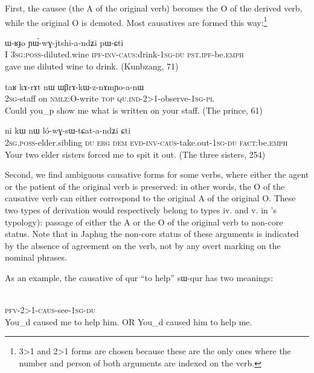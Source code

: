 \documentclass[oldfontcommands,oneside,a4paper,11pt]{article}
\newcommand{\ipa}[1]{{\phon \mbox{#1}}} %
\newcommand{\sg}{\textsc{sg}}
\newcommand{\pl}{\textsc{pl}}
\newcommand{\wav}[1]{}%
\newcommand{\pfv}{\textsc{pfv}}
\newcommand{\caus}{\textsc{caus}}
\newcommand{\dem}{\textsc{dem}}
\newcommand{\du}{\textsc{du}}
\newcommand{\erg}{\textsc{erg}}
\newcommand{\emphat}{\textsc{emph}}
\newcommand{\evd}{\textsc{evd}}
\newcommand{\inv}{\textsc{inv}}
\newcommand{\ipf}{\textsc{ipf}}
\newcommand{\nmlz}{\textsc{nmlz}}
\newcommand{\fact}{\textsc{fact}}
\newcommand{\poss}{\textsc{poss}}
\newcommand{\pst}{\textsc{pst}}
\newcommand{\topic}{\textsc{top}}
\newcommand{\quind}{\textsc{qu.ind}} %
\begin{document}
First, the causee (the A of the original verb) becomes the O of the derived verb, while the original O is demoted. Most causatives are formed this way:\footnote{3>1 and 2>1 forms are chosen because these are the only ones where the number and person of both arguments are indexed on the verb.}
 \begin{exe}
\ex
\gll  \ipa{aʑo} 	\ipa{ɯ-ʁɟo} 	\ipa{ɲɯ́-wɣ-jtshi-a-ndʑi} 	\ipa{pɯ-ɕti}  \\
  I 3\sg{}:\poss{}-diluted.wine \ipf{}-\inv{}-\caus{}:drink-1\sg{}-\du{} \pst{}.\ipf{}-be.\emphat{} \\
   gave me diluted wine to drink. (Kunbzang, 71)
\end{exe} 
 
 \begin{exe}
\ex
\gll  \ipa{nɤ-tɤɲi} 	\ipa{taʁ} 	\ipa{kɤ-rɤt} 	\ipa{nɯ} 	\ipa{ɯβrɤ-kɯ-z-nɤmɲo-a-nɯ} \\
  2\sg{}-staff on \nmlz{}:O-write \topic{} \quind{}-2>1-observe-1\sg{}-\pl{} \\
  \glt Could you_p show me what is written on your staff. (The prince, 61)
\end{exe} 

 \begin{exe}
\ex
\gll \ipa{nɤ-pi} 	\ipa{ni} 	\ipa{kɯ} 	\ipa{nɯ} 	\ipa{ló-wɣ-sɯ-tɕat-a-ndʑi} 	\ipa{ɕti}  \\
2\sg{}.\poss{}-elder.sibling \du{} \erg{} \dem{} \evd{}-\inv{}-\caus{}-take.out-1\sg{}-\du{} \fact{}:be.\emphat{} \\
  \glt Your two elder sisters forced me to spit it out. (The three sisters, 254)
\end{exe} 

Second, we find ambiguous causative forms for some verbs, where either the agent or the patient of the original verb is preserved: in other words, the O of the causative verb can either correspond to the original A of the original O. These two types of derivation would respectively belong to types iv. and v. in \citet[48]{dixon00causative}'s typology): passage of either the A or the O of the original verb to non-core status. Note that in Japhug the non-core status of these arguments is indicated by the absence of agreement on the verb, not by any overt marking on the nominal phrases. 
 
As an example, the causative of \ipa{qur} ``to help''  \ipa{sɯ-qur} has two meanings:

\begin{exe} 
\ex \label{ex:caus:show.2>3>1}
\gll   \ipa{tɤ-kɯ-sɯ-qur-a-ndʑi}  \\
 \pfv{}-2>1-\caus{}-see-1\sg{}-\du{}  \\
 \glt  You_d caused me to help him. OR You_d caused him to help me. \wav{8_tAkWsWqura}
\end{exe} 
\end{document}

